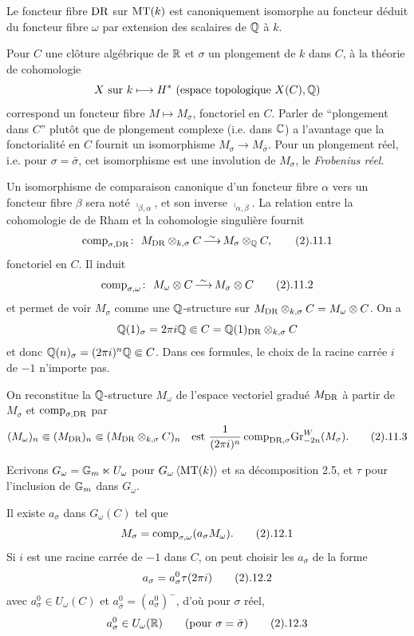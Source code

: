 Le foncteur fibre $\text{\rm DR}$ sur $\text{\rm MT}(k)$ est
canoniquement isomorphe au foncteur d\'eduit
du foncteur fibre $\omega$ par extension des
scalaires de ${\Bbb Q}$ \`a $k$.
\endproclaim

\endsubhead
Pour $C$ une cl\^{o}ture alg\'ebrique de ${\Bbb R}$
et $\sigma$ un plongement de $k$ dans $C$, \`a
la th\'eorie de cohomologie
$$
X\text{ sur } k\longmapsto H^*\text{ (espace
topologique $X(C),{\Bbb Q}$)}
$$
correspond un foncteur fibre $M\mapsto
M_\sigma$, fonctoriel en $C$.
Parler de ``plongement dans $C$'' plut\^{o}t
que de plongement complexe (i.e. dans ${\Bbb C}$)
a l'avantage que la fonctorialit\'e en $C$
fournit un isomorphisme
$M_\sigma\to M_{\bar{\sigma}}$.
Pour un plongement r\'eel, i.e. pour 
$\sigma=\bar{\sigma}$, cet isomorphisme est
une involution de $M_\sigma$, le {\it Frobenius 
r\'eel}.

Un isomorphisme de comparaison canonique d'un
foncteur fibre $\alpha$ vers un foncteur
fibre $\beta$ sera not\'e
$\comp_{\beta,\alpha}$, et son inverse
$\comp_{\alpha,\beta}$.
La relation entre la cohomologie de de Rham
et la cohomologie singuli\`ere fournit
$$
\comp_{\sigma,\DR}\colon\,\,M_{\DR}\otimes_{k,\sigma}
C\simover M_\sigma\otimes_\dbQ C,
\tag2.11.1
$$
fonctoriel en $C$.
Il induit
$$
\comp_{\sigma,\omega}\colon\,\,
M_\omega\otimes C\simover
M_\sigma\otimes C\tag2.11.2
$$
et permet de voir $M_\sigma$ comme une
${\Bbb Q}$-structure sur
$M_{\text{\rm DR}}\otimes_{k,\sigma}C=M_\omega\otimes
C$.
On a
$$
{\Bbb Q}(1)_\sigma=2\pi i{\Bbb Q}\Subset
C={\Bbb Q}(1)_{\text{\rm DR}}\otimes_{k,\sigma}C
$$
et donc ${\Bbb Q}(n)_\sigma=(2\pi i)^n{\Bbb Q}\Subset
C$.
Dans ces formules, le choix de la racine
carr\'ee $i$ de $-1$ n'importe pas.

On reconstitue la ${\Bbb Q}$-structure $M_\omega$
de l'espace vectoriel gradu\'e $M_{\text{\rm DR}}$ \`a
partir de $M_\sigma$ et $\text{\rm comp}_{\sigma,\text{\rm DR}}$
par
$$
(M_\omega)_n\Subset(M_{\DR})_n\Subset
(M_{\DR}\otimes_{k,\sigma} C)_n\quad 
\est~\frac{1}{(2\pi i)^n}\,\comp_{\DR,\sigma}
\Gr_{-2n}^W(M_\sigma).
\tag2.11.3
$$

Ecrivons $G_\omega={\Bbb G}_m\ltimes U_\omega$
pour $G_\omega\left<\text{\rm MT}(k)\right>$ et sa
d\'ecomposition 2.5, et $\tau$ pour
l'inclusion de ${\Bbb G}_m$ dans $G_\omega$.


Il existe $a_\sigma$ dans $G_\omega(C)$ tel que
$$
M_\sigma=\comp_{\sigma,\omega}(a_\sigma
M_\omega).\tag2.12.1
$$
Si $i$ est une racine carr\'ee de $-1$ dans
$C$, on peut choisir les $a_\sigma$ de la forme
$$
a_\sigma=a_\sigma^0\tau(2\pi i)\tag2.12.2
$$
avec $a_\sigma^0\in U_\omega(C)$ et
$a_{\bar{\sigma}}^0=(a_\sigma^0)^-$, d'o\`u
pour $\sigma$ r\'eel, 
$$
a_\sigma^0\in U_\omega(\dbR)\qquad
\text{(pour $\sigma=\bar{\sigma})$}
\tag2.12.3
$$
\endproclaim

